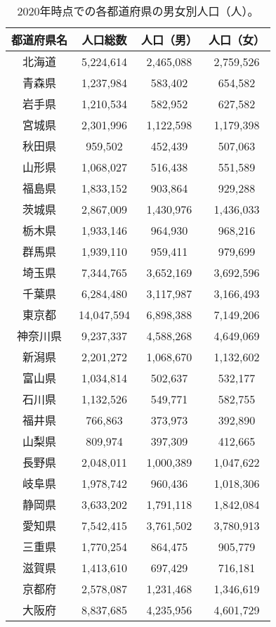 \documentclass[a4paper, platex, dvipdfmx]{jsarticle}
\begin{document}
\begin{table}
  \centering
  \caption{2020年時点での各都道府県の男女別人口（人）。}
  \begin{tabular}{cccc}
    \hline
    都道府県名 & 人口総数 & 人口（男） & 人口（女）\\\hline
    北海道 & 5,224,614 & 2,465,088 & 2,759,526 \\
    青森県 & 1,237,984 & 583,402 & 654,582 \\
    岩手県 & 1,210,534 & 582,952 & 627,582 \\
    宮城県 & 2,301,996 & 1,122,598 & 1,179,398 \\
    秋田県 & 959,502 & 452,439 & 507,063 \\
    山形県 & 1,068,027 & 516,438 & 551,589 \\
    福島県 & 1,833,152 & 903,864 & 929,288 \\
    茨城県 & 2,867,009 & 1,430,976 & 1,436,033 \\
    栃木県 & 1,933,146 & 964,930 & 968,216 \\
    群馬県 & 1,939,110 & 959,411 & 979,699 \\
    埼玉県 & 7,344,765 & 3,652,169 & 3,692,596 \\
    千葉県 & 6,284,480 & 3,117,987 & 3,166,493 \\
    東京都 & 14,047,594 & 6,898,388 & 7,149,206 \\
    神奈川県 & 9,237,337 & 4,588,268 & 4,649,069 \\
    新潟県 & 2,201,272 & 1,068,670 & 1,132,602 \\
    富山県 & 1,034,814 & 502,637 & 532,177 \\
    石川県 & 1,132,526 & 549,771 & 582,755 \\
    福井県 & 766,863 & 373,973 & 392,890 \\
    山梨県 & 809,974 & 397,309 & 412,665 \\
    長野県 & 2,048,011 & 1,000,389 & 1,047,622 \\
    岐阜県 & 1,978,742 & 960,436 & 1,018,306 \\
    静岡県 & 3,633,202 & 1,791,118 & 1,842,084 \\
    愛知県 & 7,542,415 & 3,761,502 & 3,780,913 \\
    三重県 & 1,770,254 & 864,475 & 905,779 \\
    滋賀県 & 1,413,610 & 697,429 & 716,181 \\
    京都府 & 2,578,087 & 1,231,468 & 1,346,619 \\
    大阪府 & 8,837,685 & 4,235,956 & 4,601,729 \\

\end{tabular}
\end{table}
\end{document}
